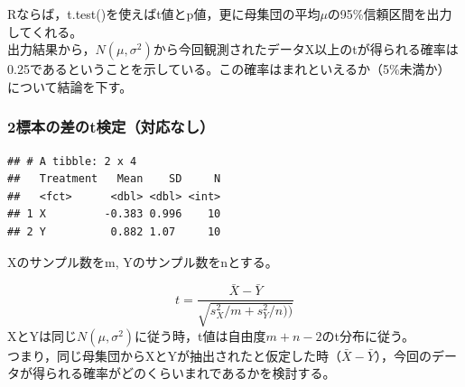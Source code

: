 \documentclass[]{article}
\newenvironment{Shaded}{\begin{snugshade}}{\end{snugshade}}
\newcommand{\KeywordTok}[1]{\textcolor[rgb]{0.13,0.29,0.53}{\textbf{#1}}}
\newcommand{\DataTypeTok}[1]{\textcolor[rgb]{0.13,0.29,0.53}{#1}}
\newcommand{\DecValTok}[1]{\textcolor[rgb]{0.00,0.00,0.81}{#1}}
\newcommand{\StringTok}[1]{\textcolor[rgb]{0.31,0.60,0.02}{#1}}
\newcommand{\OperatorTok}[1]{\textcolor[rgb]{0.81,0.36,0.00}{\textbf{#1}}}
\newcommand{\NormalTok}[1]{#1}
\begin{document}
Rならば，t.test()を使えばt値とp値，更に母集団の平均\(\mu\)の95\%信頼区間を出力してくれる。\\
出力結果から，\(N(\mu, \sigma^2)\)から今回観測されたデータX以上のtが得られる確率は0.25であるということを示している。この確率はまれといえるか（5\%未満か）について結論を下す。

\subsubsection{2標本の差のt検定（対応なし）}\label{t}

\begin{Shaded}
\end{Shaded}

\begin{verbatim}
## # A tibble: 2 x 4
##   Treatment   Mean    SD     N
##   <fct>      <dbl> <dbl> <int>
## 1 X         -0.383 0.996    10
## 2 Y          0.882 1.07     10
\end{verbatim}

Xのサンプル数をm, Yのサンプル数をnとする。

\[
t = \frac{\bar{X} - \bar{Y}}{\sqrt{s^2_{X}/m+s^2_{Y}/n))}}
\]
XとYは同じ\(N(\mu, \sigma^2)\)に従う時，t値は自由度\(m+n-2\)のt分布に従う。\\
つまり，同じ母集団からXとYが抽出されたと仮定した時（\(\bar{X} - \bar{Y}\)），今回のデータが得られる確率がどのくらいまれであるかを検討する。
\end{document}
